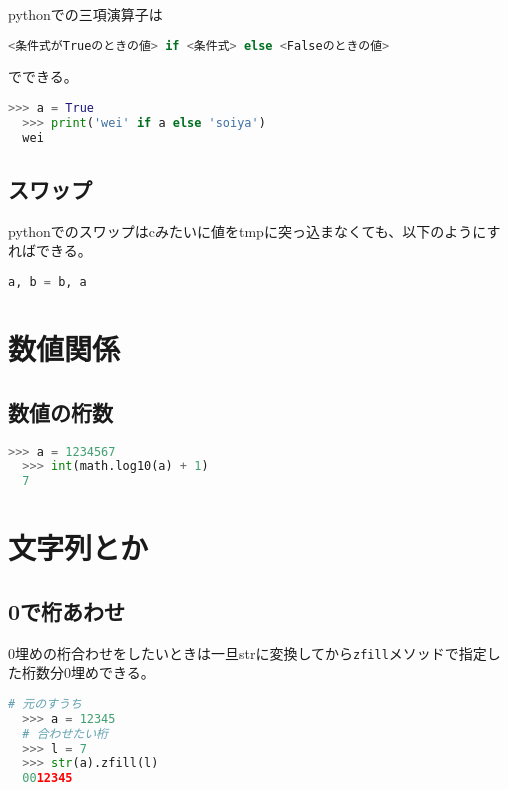 \documentclass[uplatex, 11pt]{jsarticle}
\begin{document}
pythonでの三項演算子は

\begin{lstlisting}[language=Python]
  <条件式がTrueのときの値> if <条件式> else <Falseのときの値>
\end{lstlisting}

でできる。

\begin{lstlisting}[language=Python]
  >>> a = True
  >>> print('wei' if a else 'soiya')
  wei
\end{lstlisting}

\subsection{スワップ}

pythonでのスワップはcみたいに値をtmpに突っ込まなくても、以下のようにすればできる。

\begin{lstlisting}[language=Python]
  a, b = b, a
\end{lstlisting}



\section{数値関係}

\subsection{数値の桁数}

\begin{lstlisting}[language=Python]
  >>> a = 1234567
  >>> int(math.log10(a) + 1)
  7
\end{lstlisting}

\section{文字列とか}

\subsection{0で桁あわせ}

0埋めの桁合わせをしたいときは一旦strに変換してから\texttt{zfill}メソッドで指定した桁数分0埋めできる。

\begin{lstlisting}[language=Python]
  # 元のすうち
  >>> a = 12345
  # 合わせたい桁
  >>> l = 7
  >>> str(a).zfill(l)
  0012345
\end{lstlisting}
\end{document}
